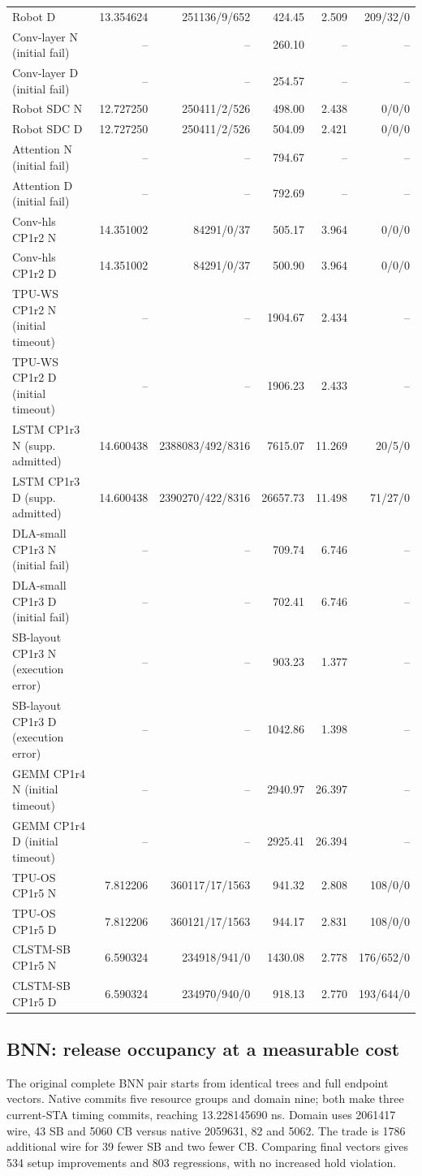 \documentclass[conference,10pt]{IEEEtran}
\begin{document}
\begin{table}[t]
\begin{tabular}{lrrrrr}
Robot D&13.354624&251136/9/652&424.45&2.509&209/32/0\\
Conv-layer N (initial fail)&--&--&260.10&--&--\\
Conv-layer D (initial fail)&--&--&254.57&--&--\\
Robot SDC N&12.727250&250411/2/526&498.00&2.438&0/0/0\\
Robot SDC D&12.727250&250411/2/526&504.09&2.421&0/0/0\\
Attention N (initial fail)&--&--&794.67&--&--\\
Attention D (initial fail)&--&--&792.69&--&--\\
Conv-hls CP1r2 N&14.351002&84291/0/37&505.17&3.964&0/0/0\\
Conv-hls CP1r2 D&14.351002&84291/0/37&500.90&3.964&0/0/0\\
TPU-WS CP1r2 N (initial timeout)&--&--&1904.67&2.434&--\\
TPU-WS CP1r2 D (initial timeout)&--&--&1906.23&2.433&--\\
LSTM CP1r3 N (supp. admitted)&14.600438&2388083/492/8316&7615.07&11.269&20/5/0\\
LSTM CP1r3 D (supp. admitted)&14.600438&2390270/422/8316&26657.73&11.498&71/27/0\\
DLA-small CP1r3 N (initial fail)&--&--&709.74&6.746&--\\
DLA-small CP1r3 D (initial fail)&--&--&702.41&6.746&--\\
SB-layout CP1r3 N (execution error)&--&--&903.23&1.377&--\\
SB-layout CP1r3 D (execution error)&--&--&1042.86&1.398&--\\
GEMM CP1r4 N (initial timeout)&--&--&2940.97&26.397&--\\
GEMM CP1r4 D (initial timeout)&--&--&2925.41&26.394&--\\
TPU-OS CP1r5 N&7.812206&360117/17/1563&941.32&2.808&108/0/0\\
TPU-OS CP1r5 D&7.812206&360121/17/1563&944.17&2.831&108/0/0\\
CLSTM-SB CP1r5 N&6.590324&234918/941/0&1430.08&2.778&176/652/0\\
CLSTM-SB CP1r5 D&6.590324&234970/940/0&918.13&2.770&193/644/0\\
\hline\end{tabular}
\end{table}

\subsection{BNN: release occupancy at a measurable cost}
The original complete BNN pair starts from identical trees and full endpoint vectors. Native commits five resource groups and domain nine; both make three current-STA timing commits, reaching 13.228145690 ns. Domain uses 2061417 wire, 43 SB and 5060 CB versus native 2059631, 82 and 5062. The trade is 1786 additional wire for 39 fewer SB and two fewer CB. Comparing final vectors gives 534 setup improvements and 803 regressions, with no increased hold violation.
\end{document}

